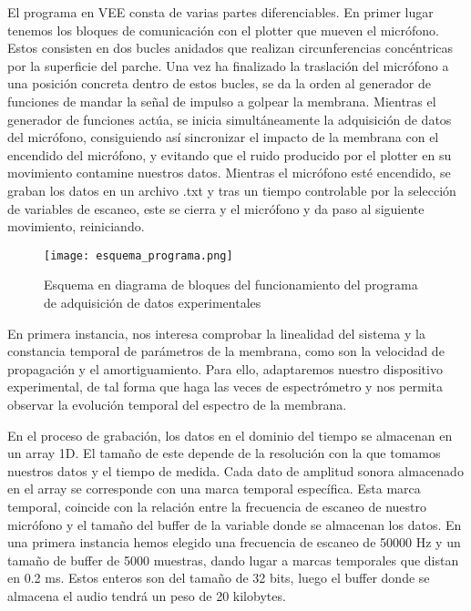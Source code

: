 \documentclass[journal, a4paper,onecolumn]{IEEEtran}
\begin{document}
El programa en VEE consta de varias partes diferenciables.
En primer lugar tenemos los bloques de comunicación con el plotter que mueven el micrófono. Estos consisten en dos bucles anidados que realizan circunferencias concéntricas por la superficie del parche. Una vez ha finalizado la traslación del micrófono a una posición concreta dentro de estos bucles, se da la orden al generador de funciones de mandar la señal de impulso a golpear la membrana. Mientras el generador de funciones actúa, se inicia simultáneamente la adquisición de datos del micrófono, consiguiendo así sincronizar el impacto de la membrana con el encendido del micrófono, y evitando que el ruido producido por el plotter en su movimiento contamine nuestros datos. Mientras el micrófono esté encendido, se graban los datos en un archivo .txt y tras un tiempo controlable por la selección de variables de escaneo, este se cierra y el micrófono y da paso al siguiente movimiento, reiniciando.  
\newline

\begin{figure}[H]
    \centering
    \texttt{[image: esquema\_programa.png]}
    \caption{Esquema en diagrama de bloques del funcionamiento del programa de adquisición de datos experimentales}
    \label{esquema}
\end{figure}

En primera instancia, nos interesa comprobar la linealidad del sistema y la constancia temporal de parámetros de la membrana, como son la velocidad de propagación y el amortiguamiento. Para ello, adaptaremos nuestro dispositivo experimental, de tal forma que haga las veces de espectrómetro y nos permita observar la evolución temporal del espectro de la membrana. \newline

En el proceso de grabación, los datos en el dominio del tiempo se almacenan en un array 1D. El tamaño de este depende de la resolución con la que tomamos nuestros datos y el tiempo de medida. Cada dato de amplitud sonora almacenado en el array se corresponde con una marca temporal específica. Esta marca temporal, coincide con la relación entre la frecuencia de escaneo de nuestro micrófono y el tamaño del buffer de la variable donde se almacenan los datos. En una primera instancia hemos elegido una frecuencia de escaneo de 50000 Hz y un tamaño de buffer de 5000 muestras, dando lugar a marcas temporales que distan en 0.2 ms. Estos enteros son del tamaño de 32 bits, luego el buffer donde se almacena el audio tendrá un peso de 20 kilobytes. \newline
\end{document}
